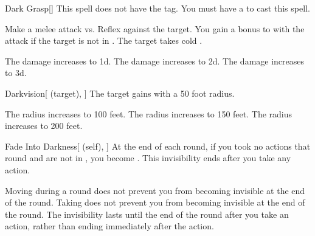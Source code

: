 \lowercase{\hypertarget{spell:Dark Grasp}{}}\label{spell:Dark Grasp}
\begin{freeability}[Rank 2]{\hypertarget{spell:Dark Grasp}{Dark Grasp}}[]
This spell does not have the  tag.
You must have a  to cast this spell.

Make a melee attack vs. Reflex against the target.
You gain a  bonus to  with the attack if the target is not in .
\hit The target takes cold .

\rankline
{} The damage increases to  \plus1d.
 The damage increases to  \plus2d.
 The damage increases to  \plus3d.
\end{freeability}
\vspace{0.25em}



\lowercase{\hypertarget{spell:Darkvision}{}}\label{spell:Darkvision}
\begin{attuneability}[Rank 2]{\hypertarget{spell:Darkvision}{Darkvision}}[ (target), ]
The target gains  with a 50 foot radius.

\rankline
{} The radius increases to 100 feet.
 The radius increases to 150 feet.
 The radius increases to 200 feet.
\end{attuneability}
\vspace{0.25em}



\lowercase{\hypertarget{spell:Fade Into Darkness}{}}\label{spell:Fade Into Darkness}
\begin{attuneability}[Rank 2]{\hypertarget{spell:Fade Into Darkness}{Fade Into Darkness}}[ (self), ]
At the end of each round, if you took no actions that round and are not in , you become .
This invisibility ends after you take any action.

\rankline
{} Moving during a round does not prevent you from becoming invisible at the end of the round.
 Taking  does not prevent you from becoming invisible at the end of the round.
 The invisibility lasts until the end of the round after you take an action, rather than ending immediately after the action.
\end{attuneability}
\vspace{0.25em}



